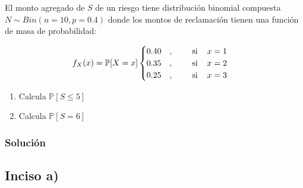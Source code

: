 \documentclass[
]{article}
\begin{document}
El monto agregado de \(S\) de un riesgo tiene distribución binomial
compuesta \(N\sim Bin(n=10,p=0.4)\) donde los montos de reclamación
tienen una función de masa de probabilidad:

\[ 
f_X(x)=\mathbb{P}[X=x]
\begin{cases}
0.40 \quad, \hspace{0.8cm} \text{si} \hspace{0.4cm} x = 1\\
0.35  \quad, \hspace{0.8cm} \text{si} \hspace{0.4cm} x=2\\
0.25  \quad, \hspace{0.8cm} \text{si} \hspace{0.4cm} x=3
\end{cases}
\]

\begin{enumerate}[label=(\alph*)]
\item Calcula $\mathbb{P}[S\leq 5]$
\item Calcula $\mathbb{P}[S = 6]$
\end{enumerate}

\hypertarget{soluciuxf3n-3}{%
\subsubsection{Solución}\label{soluciuxf3n-3}}

\hypertarget{inciso-a-2}{%
\subsection{Inciso a)}\label{inciso-a-2}}
\end{document}
